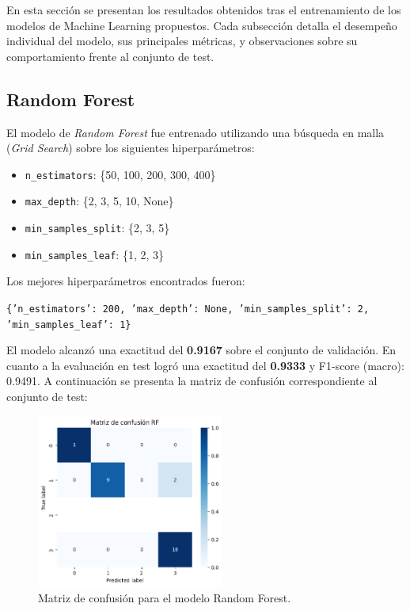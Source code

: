 \documentclass[11pt]{report}
\begin{document}
En esta sección se presentan los resultados obtenidos tras el entrenamiento de los modelos de Machine Learning propuestos. Cada subsección detalla el desempeño individual del modelo, sus principales métricas, y observaciones sobre su comportamiento frente al conjunto de test.

\subsection{Random Forest}

El modelo de \textit{Random Forest} fue entrenado utilizando una búsqueda en malla (\textit{Grid Search}) sobre los siguientes hiperparámetros:

\begin{itemize}[noitemsep]
  \item \texttt{n\_estimators}: \{50, 100, 200, 300, 400\}
  \item \texttt{max\_depth}: \{2, 3, 5, 10, None\}
  \item \texttt{min\_samples\_split}: \{2, 3, 5\}
  \item \texttt{min\_samples\_leaf}: \{1, 2, 3\}
\end{itemize}

Los mejores hiperparámetros encontrados fueron:
\begin{center}
\texttt{\{'n\_estimators': 200, 'max\_depth': None, 'min\_samples\_split': 2, 'min\_samples\_leaf': 1\}}
\end{center}

El modelo alcanzó una exactitud del \textbf{0.9167} sobre el conjunto de validación. En cuanto a la evaluación en test logró una exactitud del \textbf{0.9333} y F1-score (macro): 0.9491.  
A continuación se presenta la matriz de confusión correspondiente al conjunto de test:

\begin{figure}[H]
    \centering
    \includegraphics[width=0.55\textwidth]{Imagenes/Matriz-Randomforest.png}
    \caption{Matriz de confusión para el modelo Random Forest.}
    \label{fig:cm-randomforest}
\end{figure}
\end{document}
